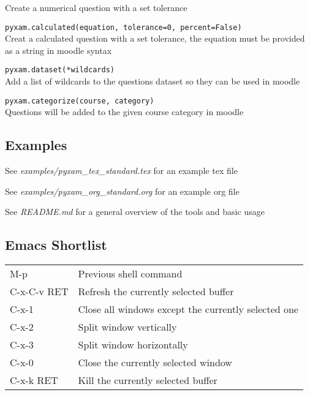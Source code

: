 \documentclass[9pt]{extarticle}
\begin{document}
\begin{multicols}{2}
\begin{description}
    Create a numerical question with a set tolerance
    \\
\item\texttt{pyxam.calculated(equation, tolerance=0, percent=False)} \\
    Creat a calculated question with a set tolerance, the equation must be provided as a string in moodle syntax
    \\
\item\texttt{pyxam.dataset(*wildcards)} \\
    Add a list of wildcards to the questions dataset so they can be used in moodle
    \\
\item\texttt{pyxam.categorize(course, category)} \\
    Questions will be added to the given course category in moodle
    \\
\end{description}
\subsection*{Examples}
\begin{description}
    \item See {\it examples/pyxam\_tex\_standard.tex} for an example tex file
    \item See {\it examples/pyxam\_org\_standard.org} for an example org file
    \item See {\it README.md} for a general overview of the tools and basic usage 
\end{description}
\subsection*{Emacs Shortlist}
\begin{tabular}{l l}
M-p & Previous shell command \\
C-x-C-v RET & Refresh the currently selected buffer \\
C-x-1 & Close all windows except the currently selected one \\
C-x-2 & Split window vertically \\
C-x-3 & Split window horizontally \\
C-x-0 & Close the currently selected window \\
C-x-k RET & Kill the currently selected buffer \\
\end{tabular}

\end{multicols}
\end{document}
